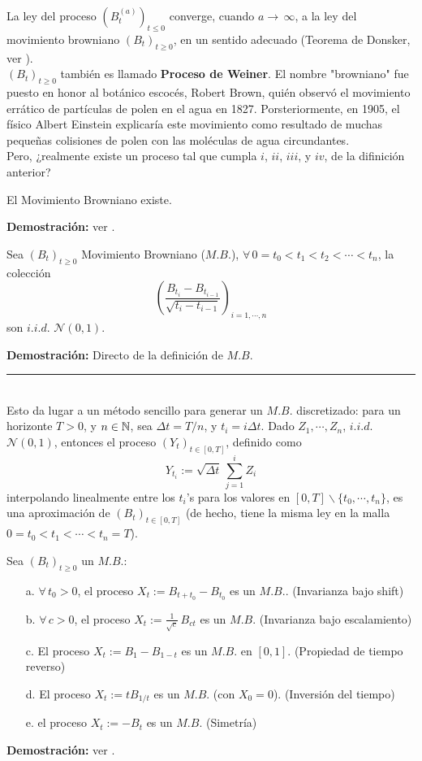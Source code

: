 La ley del proceso $(B_t^{(a)})_{t\leq 0}$ converge, cuando $a\rightarrow\,\infty$, a la ley del movimiento browniano $(B_t)_{t\geq 0}$, en un sentido adecuado (Teorema de Donsker, ver \cite[cap.2, Teo.4.2]{Kara}).\\ \newline $(B_t)_{t\geq 0}$ también es llamado \textbf{Proceso de Weiner}. El nombre "browniano" fue puesto en honor al botánico escocés, Robert Brown, quién observó el movimiento errático de partículas de polen en el agua en 1827. Porsteriormente, en 1905, el físico Albert Einstein explicaría este movimiento como resultado  de muchas pequeñas colisiones de polen con las moléculas de agua circundantes.\\ \newline
Pero, ¿realmente existe un proceso tal que cumpla $i$, $ii$, $iii$, y $iv$, de la difinición anterior?
\begin{teorema}
El Movimiento Browniano existe.
\end{teorema}
\textbf{Demostración: } ver \cite[cap. 2]{Kara}.\\

\begin{prop}Sea $(B_t)_{t\geq 0}$ Movimiento Browniano ($M.B.$), $\forall\, 0=t_0<t_1<t_2<\cdots<t_n$, la colección
\[\left(\frac{B_{t_i}-B_{t_{i-1}}}{\sqrt{t_i-t_{i-1}}}\right)_{i=1,\cdots,n}\]
son $i.i.d.$ $\mathcal{N}(0,1)$.
\label{prop17}
\end{prop}
\textbf{Demostración: }Directo de la definición de $M.B$.\\\rule{0.7em}{0.7em}\\ \newline
Esto da lugar  a un método sencillo para generar un $M.B.$ discretizado: para un horizonte $T>0$, y $n\in\mathbb N$, sea $\Delta t = T/n$, y $t_i = i\Delta t$. Dado $Z_1,\cdots, Z_n$,  $i.i.d.$ $\mathcal{N}(0,1)$, entonces el proceso $(Y_t)_{t\in [0,T]}$, definido como 
\[Y_{t_i}:= \sqrt{\Delta t}\,\sum_{j=1}^i Z_i\]
interpolando linealmente entre los $t_i$'s para los valores en $[0,T]\backslash\{t_0,\cdots,t_n\}$, es una aproximación de $(B_t)_{t\in[0,T]}$ (de hecho, tiene la misma ley en la malla $0=t_0<t_1<\cdots<t_n=T$).

\begin{prop} Sea $(B_t)_{t\geq 0}$ un $M.B.$:
\begin{enumerate}
    \item[a.] $\forall\,t_0>0$, el proceso $X_t := B_{t+t_0}-B_{t_0}$ es un $M.B.$. (Invarianza bajo shift)
    \item[b.] $\forall\,c>0$, el proceso $X_t := \frac{1}{\sqrt{c}}\,B_{ct}$ es un $M.B.$ (Invarianza bajo escalamiento)
    \item[c.] El proceso $X_t := B_1 - B_{1-t}$ es un $M.B.$ en $[0,1]$. (Propiedad de tiempo reverso)
    \item[d.]  El proceso $X_t:=tB_{1/t}$ es un $M.B.$ (con $X_0 =0$). (Inversión del tiempo)
    \item[e.] el proceso $X_t:=-B_t$ es un $M.B.$ (Simetría)
\end{enumerate}
\label{prop18}
\end{prop}
\textbf{Demostración: }ver \cite[cap. 2]{Kara}.

